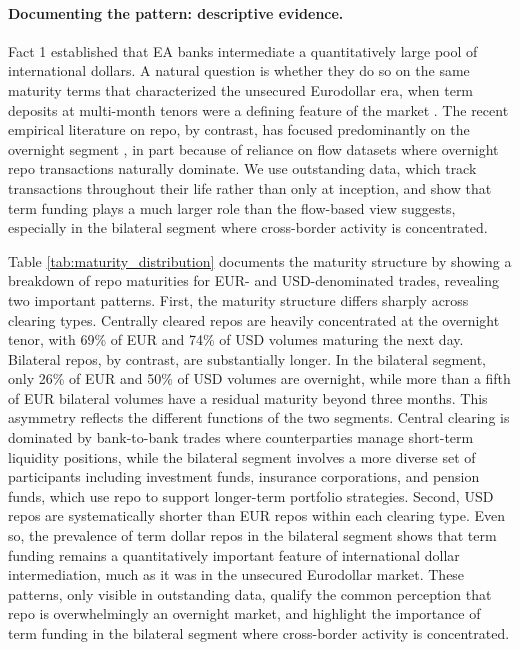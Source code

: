 \documentclass[english, 12pt, oneside]{article}
\begin{document}
\paragraph{Documenting the pattern: descriptive evidence.}
Fact 1 established that EA banks intermediate a quantitatively large pool of international dollars. A natural question is whether they do so on the same maturity terms that characterized the unsecured Eurodollar era, when term deposits at multi-month tenors were a defining feature of the market \citep{goodfriend1981}. The recent empirical literature on repo, by contrast, has focused predominantly on the overnight segment \citep{mancini2016, bechtel2023, huser2024}, in part because of reliance on flow datasets where overnight repo transactions naturally dominate. We use outstanding data, which track transactions throughout their life rather than only at inception, and show that term funding plays a much larger role than the flow-based view suggests, especially in the bilateral segment where cross-border activity is concentrated.

Table \ref{tab:maturity_distribution} documents the maturity structure by showing a breakdown of repo maturities for EUR- and USD-denominated trades, revealing two important patterns. First, the maturity structure differs sharply across clearing types. Centrally cleared repos are heavily concentrated at the overnight tenor, with 69\% of EUR and 74\% of USD volumes maturing the next day. Bilateral repos, by contrast, are substantially longer. In the bilateral segment, only 26\% of EUR and 50\% of USD volumes are overnight, while more than a fifth of EUR bilateral volumes have a residual maturity beyond three months. This asymmetry reflects the different functions of the two segments. Central clearing is dominated by bank-to-bank trades where counterparties manage short-term liquidity positions, while the bilateral segment involves a more diverse set of participants including investment funds, insurance corporations, and pension funds, which use repo to support longer-term portfolio strategies. Second, USD repos are systematically shorter than EUR repos within each clearing type. Even so, the prevalence of term dollar repos in the bilateral segment shows that term funding remains a quantitatively important feature of international dollar intermediation, much as it was in the unsecured Eurodollar market. These patterns, only visible in outstanding data, qualify the common perception that repo is overwhelmingly an overnight market, and highlight the importance of term funding in the bilateral segment where cross-border activity is concentrated. 
\end{document}
